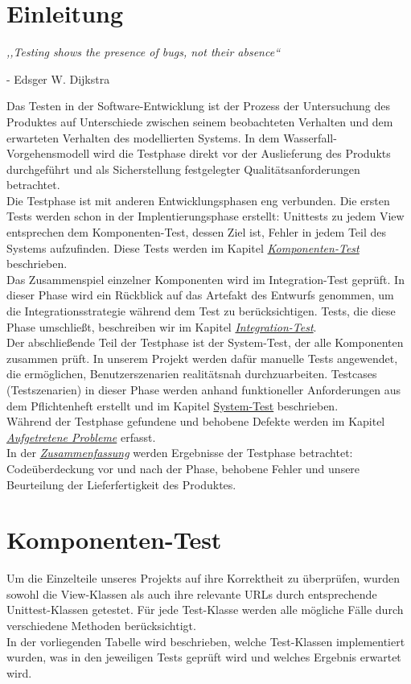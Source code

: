 \documentclass[parskip=full,11pt]{scrartcl}
\begin{document}
 \section{Einleitung}
\begin{center}
\textit{,,Testing shows the presence of bugs, not their absence``}
\end{center}
\begin{flushright}
- Edsger W. Dijkstra\\
\end{flushright}
Das Testen in der Software-Entwicklung ist der Prozess der Untersuchung des Produktes auf Unterschiede zwischen seinem beobachteten Verhalten und dem erwarteten Verhalten des modellierten Systems.
In dem Wasserfall-Vorgehensmodell wird die Testphase direkt vor der Auslieferung des Produkts durchgeführt und als Sicherstellung festgelegter Qualitätsanforderungen betrachtet.\\
Die Testphase ist mit anderen Entwicklungsphasen eng verbunden. Die ersten Tests werden schon in der Implentierungsphase erstellt: Unittests zu jedem View entsprechen dem Komponenten-Test, dessen Ziel ist, Fehler in jedem Teil des Systems aufzufinden. Diese Tests werden im Kapitel \hyperref[komponententest]{\textit{Komponenten-Test}} beschrieben.\\
Das Zusammenspiel einzelner Komponenten wird im Integration-Test geprüft. In dieser Phase wird ein Rückblick auf das Artefakt des Entwurfs genommen, um die Integrationsstrategie während dem Test zu berücksichtigen. Tests, die diese Phase umschlie{\ss}t, beschreiben wir im Kapitel \hyperref[integrationtest]{\textit{Integration-Test}}.\\
Der abschlie{\ss}ende Teil der Testphase ist der System-Test, der alle Komponenten zusammen prüft. In unserem Projekt werden dafür manuelle Tests angewendet, die ermöglichen, Benutzerszenarien realitätsnah durchzuarbeiten. Testcases (Testszenarien) in dieser Phase werden anhand funktioneller Anforderungen aus dem Pflichtenheft erstellt und im Kapitel \hyperref[systemtest]{System-Test} beschrieben.\\
Während der Testphase gefundene und behobene  Defekte werden im Kapitel \hyperref[bugs]{\textit{Aufgetretene Probleme}} erfasst.\\
In der \hyperref[zusammenfassung]{\textit{Zusammenfassung}} werden Ergebnisse der Testphase betrachtet: Codeüberdeckung vor und nach der Phase, behobene Fehler und unsere Beurteilung der Lieferfertigkeit des Produktes.
 \newpage
\section{Komponenten-Test} \label{komponententest}
Um die Einzelteile unseres Projekts auf ihre Korrektheit zu überprüfen, wurden sowohl die View-Klassen als auch ihre relevante URLs durch entsprechende Unittest-Klassen getestet. Für jede Test-Klasse werden alle mögliche Fälle durch verschiedene Methoden berücksichtigt.\\
In der vorliegenden Tabelle wird beschrieben, welche Test-Klassen implementiert wurden, was in den jeweiligen Tests geprüft wird und welches Ergebnis erwartet wird.
\end{document}
